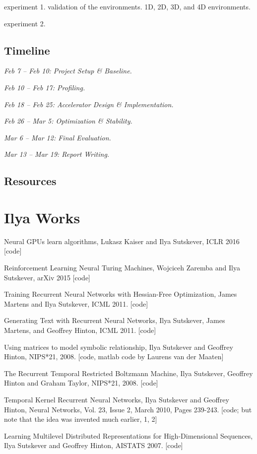 experiment 1. validation of the environments. 1D, 2D, 3D, and 4D environments.

experiment 2. 


\subsection{Timeline}
\textit{Feb 7 -- Feb 10: Project Setup \& Baseline.}

\textit{Feb 10 -- Feb 17: Profiling.}

\textit{Feb 18 -- Feb 25: Accelerator Design \& Implementation.}

\textit{Feb 26 -- Mar 5: Optimization \& Stability.}

\textit{Mar 6 -- Mar 12: Final Evaluation.}

\textit{Mar 13 -- Mar 19: Report Writing.}


\subsection{Resources}

\section{Ilya Works}
Neural GPUs learn algorithms,
Lukasz Kaiser and Ilya Sutskever, ICLR 2016
[code]

Reinforcement Learning Neural Turing Machines,
Wojciceh Zaremba and Ilya Sutskever, arXiv 2015
[code]

Training Recurrent Neural Networks with Hessian-Free Optimization,
James Martens and Ilya Sutskever, ICML 2011.
[code]

Generating Text with Recurrent Neural Networks,
Ilya Sutskever, James Martens, and Geoffrey Hinton, ICML 2011.
[code]

Using matrices to model symbolic relationship,
Ilya Sutskever and Geoffrey Hinton, NIPS*21, 2008.
[code, matlab code by Laurens van der Maaten]

The Recurrent Temporal Restricted Boltzmann Machine,
Ilya Sutskever, Geoffrey Hinton and Graham Taylor, NIPS*21, 2008.
[code]

Temporal Kernel Recurrent Neural Networks,
Ilya Sutskever and Geoffrey Hinton, Neural Networks, Vol. 23, Issue 2, March 2010, Pages 239-243.
[code; but note that the idea was invented much earlier, 1, 2]

Learning Multilevel Distributed Representations for High-Dimensional Sequences,
Ilya Sutskever and Geoffrey Hinton, AISTATS 2007.
[code]




